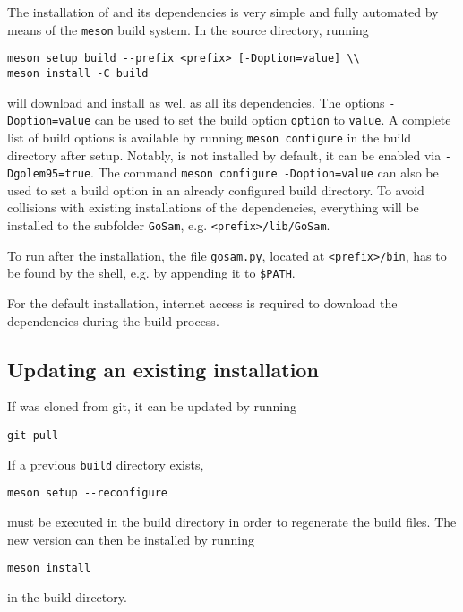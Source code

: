 The installation of \gosam and its dependencies is very simple and fully automated by means of the \texttt{meson}
build system. In the \gosam source directory, running
\begin{lstlisting}[style=sh]
meson setup build --prefix <prefix> [-Doption=value] \\
meson install -C build
\end{lstlisting}
will download and install \gosam as well as all its dependencies. The options \texttt{-Doption=value} can
be used to set the build option \texttt{option} to \texttt{value}. A complete list of build options is available by
running \texttt{meson configure} in the build directory after
setup. Notably, \golemVC is not installed by default, it can be
enabled via \texttt{-Dgolem95=true}. The command \texttt{meson configure -Doption=value} can also
be used to set a build option in an already configured build directory. To avoid collisions with existing
installations of the dependencies, everything will be installed to the subfolder \texttt{GoSam},
e.g. \texttt{<prefix>/lib/GoSam}.

To run \gosam after the installation, the file \texttt{gosam.py}, located at \texttt{<prefix>/bin}, has to be found by the shell, e.g. by appending it to \texttt{\$PATH}.

For the default installation, internet access is required to download the dependencies during the build process.


\subsection{Updating an existing installation}

If \gosam was cloned from git, it can be updated by running
\begin{lstlisting}[style=sh]
git pull
\end{lstlisting}
If a previous \texttt{build} directory exists,
\begin{lstlisting}[style=sh]
meson setup --reconfigure
\end{lstlisting}
must be executed in the build directory in order to regenerate the build files. The new version can then be installed by running
\begin{lstlisting}[style=sh]
meson install
\end{lstlisting}
in the build directory.

